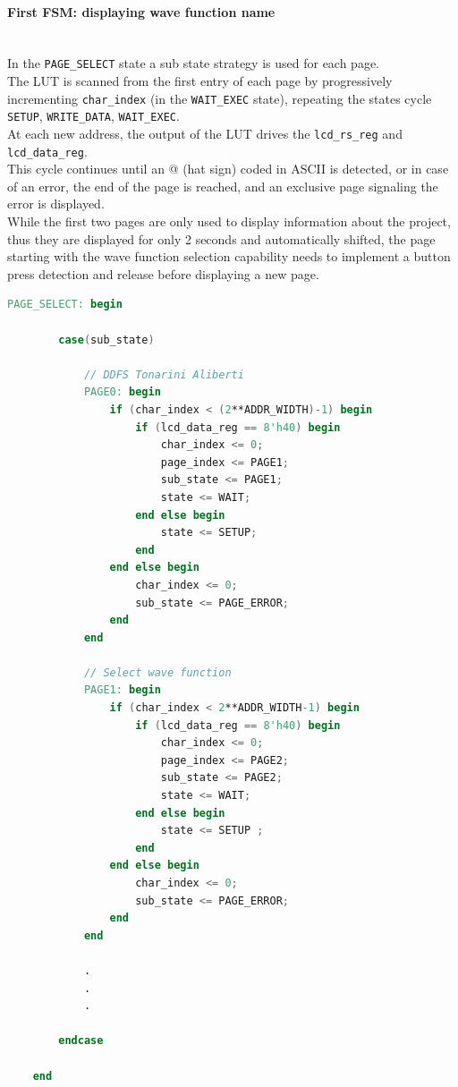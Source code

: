 \paragraph{First FSM: displaying wave function name} \quad \\
In the \texttt{PAGE\_SELECT} state a sub state strategy is used for each page. \\
The LUT is scanned from the first entry of each page by progressively incrementing \texttt{char\_index} (in the \texttt{WAIT\_EXEC} state), repeating the states cycle \texttt{SETUP}, \texttt{WRITE\_DATA}, \texttt{WAIT\_EXEC}. \\
At each new address, the output of the LUT drives the \texttt{lcd\_rs\_reg} and \texttt{lcd\_data\_reg}. \\
This cycle continues until an @ (hat sign) coded in ASCII is detected, or in case of an error, the end of the page is reached, and an exclusive page signaling the error is displayed. \\
While the first two pages are only used to display information about the project, thus they are displayed for only 2 seconds and automatically shifted, the page starting with the wave function selection capability needs to implement a button press detection and release before displaying a new page.  

\vspace{1cm}
\begin{lstlisting}[language=Verilog, caption= Page selection Sub State Machine ]
    PAGE_SELECT: begin
				
        case(sub_state)

            // DDFS Tonarini Aliberti
            PAGE0: begin
                if (char_index < (2**ADDR_WIDTH)-1) begin
                    if (lcd_data_reg == 8'h40) begin
                        char_index <= 0;
                        page_index <= PAGE1;
                        sub_state <= PAGE1;	
                        state <= WAIT;	
                    end else begin
                        state <= SETUP;
                    end
                end else begin 
                    char_index <= 0; 
                    sub_state <= PAGE_ERROR; 
                end
            end
            
            // Select wave function 
            PAGE1: begin
                if (char_index < 2**ADDR_WIDTH-1) begin
                    if (lcd_data_reg == 8'h40) begin
                        char_index <= 0;
                        page_index <= PAGE2;
                        sub_state <= PAGE2;
                        state <= WAIT;	
                    end else begin
                        state <= SETUP ;
                    end
                end else begin 
                    char_index <= 0; 
                    sub_state <= PAGE_ERROR; 
                end 
            end
            
            .
            .
            .
                
        endcase

    end
\end{lstlisting}
\vspace{1cm}

